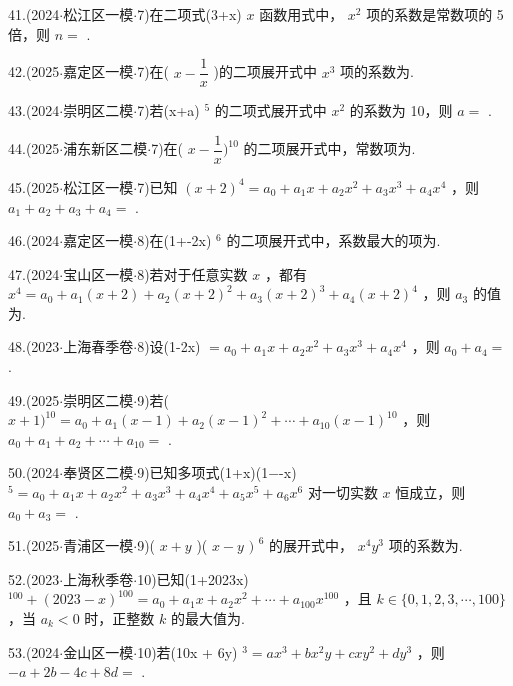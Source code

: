 41.(2024$\cdot$松江区一模$\cdot$7)在二项式(3+x) $x$ 函数用式中， ${x}^{2}$ 项的系数是常数项的 5 倍，则 $n =$ \blkda[2]{}.

42.(2025$\cdot$嘉定区一模$\cdot$7)在( $x - \dfrac{1}{x}$ )的二项展开式中 ${x}^{3}$ 项的系数为\blkda[2]{}.

43.(2024$\cdot$崇明区二模$\cdot$7)若(x+a) $^{5}$ 的二项式展开式中 ${x}^{2}$ 的系数为 10，则 $a =$ \blkda[2]{}.

44.(2025$\cdot$浦东新区二模$\cdot$7)在( $x - \dfrac{1}{x}{)}^{10}$ 的二项展开式中，常数项为\blkda[2]{}.

45.(2025$\cdot$松江区一模$\cdot$7)已知 ${\left( x + 2\right) }^{4} = {a}_{0} + {a}_{1}x + {a}_{2}{x}^{2} + {a}_{3}{x}^{3} + {a}_{4}{x}^{4}$ ，则 ${a}_{1} + {a}_{2} + {a}_{3} + {a}_{4} =$ \blkda[2]{}.

46.(2024$\cdot$嘉定区一模$\cdot$8)在(1+-2x) $^{6}$ 的二项展开式中，系数最大的项为\blkda[2]{}.

47.(2024$\cdot$宝山区一模$\cdot$8)若对于任意实数 $x$ ，都有 ${x}^{4} = {a}_{0} + {a}_{1}\left( {x + 2}\right)  + {a}_{2}{\left( x + 2\right) }^{2} + {a}_{3}{\left( x + 2\right) }^{3} +  {a}_{4}{\left( x + 2\right) }^{4}$ ，则 ${a}_{3}$ 的值为\blkda[2]{}.

48.(2023$\cdot$上海春季卷$\cdot$8)设(1-2x) $= {a}_{0} + {a}_{1}x + {a}_{2}{x}^{2} + {a}_{3}{x}^{3} + {a}_{4}{x}^{4}$ ，则 ${a}_{0} + {a}_{4} =$ \blkda[2]{}.

49.(2025$\cdot$崇明区二模$\cdot$9)若( $x + 1{)}^{10} = {a}_{0} + {a}_{1}\left( {x - 1}\right)  + {a}_{2}{\left( x - 1\right) }^{2} + \cdots  + {a}_{10}{\left( x - 1\right) }^{10}$ ，则 ${a}_{0} +  {a}_{1} + {a}_{2} + \cdots  + {a}_{10} =$ \blkda[2]{}.

50.(2024$\cdot$奉贤区二模$\cdot$9)已知多项式(1+x)(1−-x) $^{5} = {a}_{0} + {a}_{1}x + {a}_{2}{x}^{2} + {a}_{3}{x}^{3} + {a}_{4}{x}^{4} + {a}_{5}{x}^{5} +  {a}_{6}{x}^{6}$ 对一切实数 $x$ 恒成立，则 ${a}_{0} + {a}_{3} =$ \blkda[2]{}.

51.(2025$\cdot$青浦区一模$\cdot$9)( $x + y$ )( $x - y{\text{ ) }}^{6}$ 的展开式中， ${x}^{4}{y}^{3}$ 项的系数为\blkda[2]{}.

52.(2023$\cdot$上海秋季卷$\cdot$10)已知(1+2023x) $^{100} + {\left( {2023} - x\right) }^{100} = {a}_{0} + {a}_{1}x + {a}_{2}{x}^{2} + \cdots  + {a}_{100}{x}^{100}$ ，且 $k \in  \{ 0,1,2,3,\cdots ,{100}\}$ ，当 ${a}_{k} < 0$ 时，正整数 $k$ 的最大值为\blkda[2]{}.

53.(2024$\cdot$金山区一模$\cdot$10)若(10x + 6y) $^{3} = a{x}^{3} + b{x}^{2}y + {cx}{y}^{2} + d{y}^{3}$ ，则 $- a + {2b} - {4c} + {8d} =$ \blkda[2]{}.

